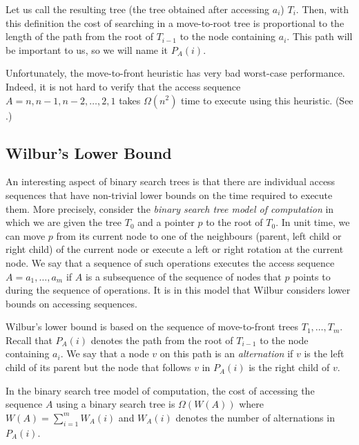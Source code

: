 \documentclass[charterfonts,lotsofwhite]{patmorin}
\newcommand{\prnt}{\mathord{parent}}
\begin{document}
\begin{algorithmic}[1]
       \STATE{$\textsc{RightRotate}(\prnt(a_i))$}
   \ELSE
       \STATE{$\textsc{LeftRotate}(\prnt(a_i))$}
   \ENDIF
\ENDWHILE
\end{algorithmic}

Let us call the resulting tree (the tree obtained after accessing
$a_i$) $T_i$.  Then, with this definition the cost of searching in a
move-to-root tree is proportional to the length of the path from the
root of $T_{i-1}$ to the node containing $a_i$.  This path will be
important to us, so we will name it $P_A(i)$.

Unfortunately, the move-to-front heuristic has very bad worst-case
performance.  Indeed, it is not hard to verify that the access
sequence $A=n,n-1,n-2,\ldots,2,1$ takes $\Omega(n^2)$ time to execute
using this heuristic.  (See .)

\subsection{Wilbur's Lower Bound}

An interesting aspect of binary search trees is that there are
individual access sequences that have non-trivial lower bounds on the
time required to execute them.  More precisely, consider the
\emph{binary search tree model of computation} in which we are given
the tree $T_0$ and a pointer $p$ to the root of $T_0$.  In unit time,
we can move $p$ from its current node to one of the neighbours
(parent, left child or right child) of the current node or execute a
left or right rotation at the current node.  We say that a sequence of
such operations executes the access sequence $A=a_1,\ldots,a_m$ if $A$
is a subsequence of the sequence of nodes that $p$ points to during
the sequence of operations.  It is in this model that Wilbur considers
lower bounds on accessing sequences.

Wilbur's lower bound is based on the sequence of move-to-front trees
$T_1,\ldots,T_m$.  Recall that $P_A(i)$ denotes the path from the root
of $T_{i-1}$ to the node containing $a_i$.  We say that a node $v$ on
this path is an \emph{alternation} if $v$ is the left child of its
parent but the node that follows $v$ in $P_A(i)$ is the right child of
$v$.

\begin{thm}
In the binary search tree model of computation, the cost of accessing
the sequence $A$ using a binary search tree is $\Omega(W(A))$ where $W(A)=\sum_{i=1}^{m}
W_A(i)$ and $W_A(i)$ denotes the number of alternations in
$P_A(i)$.
\end{thm}
\end{document}
